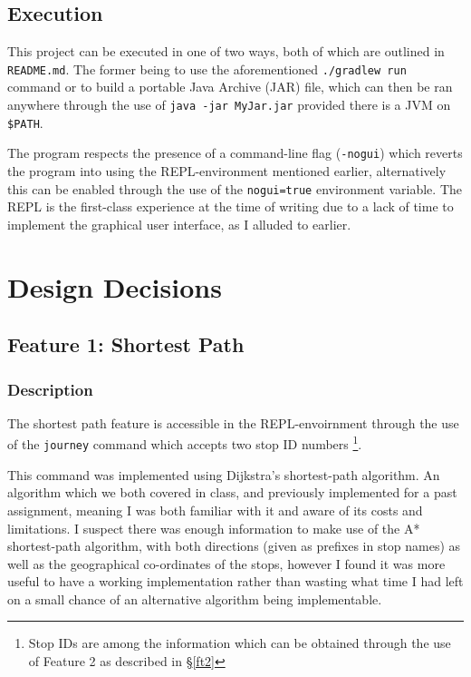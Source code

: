 \documentclass[12pt]{report}
\begin{document}
	\section{Execution}
	This project can be executed in one of two ways, both of which are outlined in \texttt{README.md}. The former being to use the aforementioned \texttt{./gradlew run} command or to build a portable Java Archive (JAR) file, which can then be ran anywhere through the use of \texttt{java -jar MyJar.jar} provided there is a JVM on \texttt{\$PATH}. \newline
	
	The program respects the presence of a command-line flag (\texttt{-nogui}) which reverts the program into using the REPL-environment mentioned earlier, alternatively this can be enabled through the use of the \texttt{nogui=true} environment variable. The REPL is the first-class experience at the time of writing due to a lack of time to implement the graphical user interface, as I alluded to earlier. 
 	
	\chapter{Design Decisions}
	\section{Feature 1: Shortest Path}
	\subsection {Description}
	The shortest path feature is accessible in the REPL-envoirnment through the use of the \texttt{journey} command which accepts two stop ID numbers \footnote{Stop IDs are among the information which can be obtained through the use of Feature 2 as described in \S\ref{ft2}}.
	
	This command was implemented using Dijkstra's shortest-path algorithm. An algorithm which we both covered in class, and previously implemented for a past assignment, meaning I was both familiar with it and aware of its costs and limitations. I suspect there was enough information to make use of the A* shortest-path algorithm, with both directions (given as prefixes in stop names) as well as the geographical co-ordinates of the stops, however I found it was more useful to have a working implementation rather than wasting what time I had left on a small chance of an alternative algorithm being implementable. \newline 
	
\end{document}
